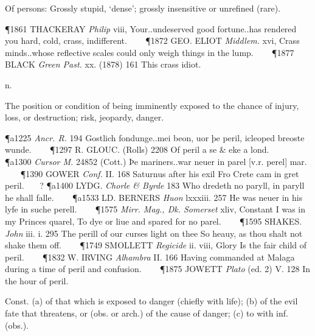 \begin{description}[wide, labelwidth=!, labelindent=0pt]
\begin{myenumerate}
 Of persons: Grossly stupid, ‘dense’; grossly insensitive or unrefined (rare).

\P 1861 THACKERAY  \textit{Philip} viii, Your..undeserved good fortune..has rendered you hard, cold, crass, indifferent.    
\P 1872 GEO. ELIOT  \textit{Middlem.} xvi, Crass minds..whose reflective scales could only weigh things in the lump.    
\P 1877 BLACK  \textit{Green Past.} xx. (1878) 161 This crass idiot.
\end{myenumerate}


 n.

\noindent {}

\noindent [a. F. péril (10th c. in Littré) = Pr. peril, perilh, Cat. peril, It. periglio:—L. perīculum, perīclum experiment, trial, risk, danger, f. root of ex-perī-rī to try, make trial of + -culum, suffix naming instruments.]
\vspace{-0.3cm}

\begin{myenumerate}

 The position or condition of being imminently exposed to the chance of injury, loss, or destruction; risk, jeopardy, danger.

\P a1225  \textit{Ancr. R.} 194 Gostlich fondunge..mei beon, uor þe peril, icleoped breoste wunde.    
\P 1297 R. GLOUC.  (Rolls) 2208 Of peril a se \& eke a lond.    
\P a1300  \textit{Cursor M.} 24852 (Cott.) Þe mariners..war neuer in parel [v.r. perel] mar.    
\P 1390 GOWER  \textit{Conf.} II. 168 Saturnus after his exil Fro Crete cam in gret peril.    ?
\P a1400 LYDG.  \textit{Chorle \& Byrde} 183 Who dredeth no paryll, in paryll he shall falle.    
\P a1533 LD. BERNERS  \textit{Huon} lxxxiii. 257 He was neuer in his lyfe in suche perell.    
\P 1575  \textit{Mirr. Mag., Dk. Somerset} xliv, Constant I was in my Princes quarel, To dye or liue and spared for no parel.    
\P 1595 SHAKES.  \textit{John} iii. i. 295 The perill of our curses light on thee So heauy, as thou shalt not shake them off.    
\P 1749 SMOLLETT  \textit{Regicide} ii. viii, Glory Is the fair child of peril.    
\P 1832 W. IRVING  \textit{Alhambra} II. 166 Having commanded at Malaga during a time of peril and confusion.    
\P 1875 JOWETT  \textit{Plato} (ed. 2) V. 128 In the hour of peril.

 Const. (a) of that which is exposed to danger (chiefly with life); (b) of the evil fate that threatens, or (obs. or arch.) of the cause of danger; (c) to with inf. (obs.).


\end{myenumerate}
\end{description}
